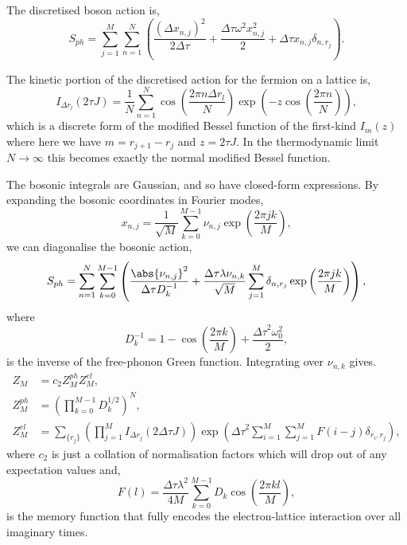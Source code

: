 The discretised boson action is,
\begin{equation}
    S_{ph} = \sum_{j=1}^M \sum_{n=1}^N \left( \frac{\left( \Delta x_{n,j} \right)^2}{2 \Delta\tau} + \frac{\Delta\tau \omega^2 x^2_{n,j}}{2} + \Delta\tau x_{n,j} \delta_{n,r_j}\right) .
\end{equation}

The kinetic portion of the discretised action for the fermion on a lattice is,
\begin{equation}
    I_{\Delta r_l}(2 \tau J) = \frac{1}{N} \sum_{n=1}^N \cos\left( \frac{2\pi n \Delta r_l}{N}  \right) \exp\left(-z \cos\left(\frac{2\pi n}{N}\right)\right) ,
\end{equation}
which is a discrete form of the modified Bessel function of the first-kind $I_m(z)$ \cite[\href{http://dlmf.nist.gov/10.32.E3}{(10.32.3)}]{NIST:DLMF} where here we have $m = r_{j+1} - r_j$ and $z = 2 \tau J$. In the thermodynamic limit $N \to \infty$ this becomes exactly the normal modified Bessel function.
\newline

The bosonic integrals are Gaussian, and so have closed-form expressions. By expanding the bosonic coordinates in Fourier modes,
\begin{equation}
    x_{n,j} = \frac{1}{\sqrt{M}} \sum_{k=0}^{M-1} \nu_{n,j} \exp\left( \frac{2\pi j k}{M} \right) ,
\end{equation}
we can diagonalise the bosonic action,
\begin{equation}
    S_{ph} = \sum_{n=1}^N \sum_{k=0}^{M-1} \left( \frac{\abs{\nu_{n,j}}^2}{\Delta\tau D_k^{-1}} + \frac{\Delta\tau \lambda \nu_{n,k}}{\sqrt{M}} \sum_{j=1}^M \delta_{n,r_j} \exp\left(\frac{2\pi j k}{M}\right) \right) ,
\end{equation}
where 
\begin{equation}
    D_k^{-1} = 1 - \cos\left(\frac{2\pi k}{M} \right) + \frac{{\Delta\tau}^2 \omega_0^2}{2} ,
\end{equation}
is the inverse of the free-phonon Green function. Integrating over $\nu_{n,k}$ gives.
\begin{equation}
    \begin{aligned}
        Z_M &= c_2 Z^{ph}_M Z_M^{el} , \\
        Z^{ph}_M &= \left( \prod_{k=0}^{M-1} D^{1/2}_k \right)^N , \\
        Z^{el}_M &= \sum_{\{r_j\}} \left( \prod_{j=1}^M I_{\Delta r_j}(2 \Delta\tau J) \right) \exp \left( {\Delta\tau}^2 \sum_{i=1}^M \sum_{j=1}^M F(i - j) \delta_{r_i, r_j} \right) ,
    \end{aligned}
\end{equation}
where $c_2$ is just a collation of normalisation factors which will drop out of any expectation values and,
\begin{equation}
    F(l) = \frac{\Delta\tau \lambda^2}{4M} \sum_{k=0}^{M-1} D_k \cos\left(\frac{2\pi k l }{M}\right) ,
\end{equation}
is the memory function that fully encodes the electron-lattice interaction over all imaginary times.

